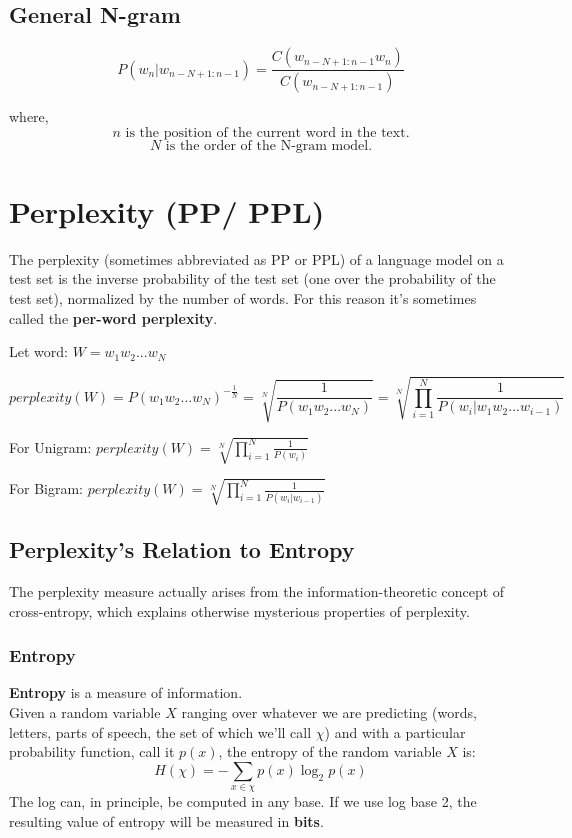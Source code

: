 \subsection{General N-gram \cite{nlp-1}}

\[
    P(w_n|w_{n-N+1:n-1}) = \displaystyle\frac{C(w_{n-N+1:n-1} w_n)}{C(w_{n-N+1:n-1})}
\]

where,
\[
    n \text{ is the position of the current word in the text.}
\]
\[
    N \text{ is the order of the N-gram model.}
\]


\section{Perplexity (PP/ PPL) \cite{nlp-1}}

The perplexity (sometimes abbreviated as PP or PPL) of a language model on a test set is the inverse probability of the test set (one over the probability of the test set), normalized by the number of words. For this reason it’s sometimes called the \textbf{per-word perplexity}.

Let word: \(W = w_1w_2 ...w_N\)

\[
    perplexity(W) = P(w_1w_2 ...w_N)^{-\displaystyle\frac{1}{N}} = \sqrt[N]{\displaystyle\frac{1}{P(w_1w_2 ...w_N)}} = \sqrt[N]{\prod_{i=1}^{N} \displaystyle\frac{1}{P(w_i|w_1w_2 ...w_{i-1})}}
\]

For Unigram:
\(
   \displaystyle perplexity(W) = \sqrt[N]{\prod_{i=1}^{N} \displaystyle\frac{1}{P(w_i)}}
\)

\vspace{0.2cm}

For Bigram:
\(
   \displaystyle perplexity(W) = \sqrt[N]{\prod_{i=1}^{N} \displaystyle\frac{1}{P(w_i|w_{i-1})}}
\)

\subsection{Perplexity’s Relation to Entropy}
The perplexity measure actually arises from the information-theoretic concept of cross-entropy, which explains otherwise mysterious properties of perplexity.

\subsubsection{Entropy}\label{Entropy}
\textbf{Entropy} is a measure of information.\\
Given a random variable $X$ ranging over whatever we are predicting (words, letters, parts of speech, the set of which we’ll call $\chi$) and with a particular probability function, call it $p(x)$, the entropy of the random variable $X$ is:
\[
    \displaystyle H(\chi) = - \sum_{x \in \chi} p(x)\log_2p(x)
\]
The log can, in principle, be computed in any base. If we use log base 2, the
resulting value of entropy will be measured in \textbf{bits}.

